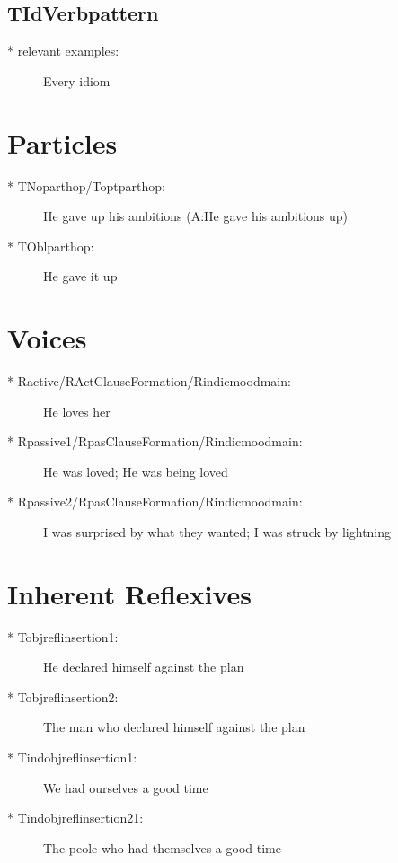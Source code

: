 \subsection{TIdVerbpattern}
\begin{description}
\item[* relevant examples:] Every idiom\\
\end{description}


\section {Particles}
\begin{description}
\item [* TNoparthop/Toptparthop:] He gave up his ambitions 
(A:He gave his ambitions up)\\
\item [* TOblparthop:] He gave it up\\
\end{description}

\section {Voices}
\begin{description}
\item [* Ractive/RActClauseFormation/Rindicmoodmain:] He loves her
\item [* Rpassive1/RpasClauseFormation/Rindicmoodmain:] He was loved; He was 
being loved
\item [* Rpassive2/RpasClauseFormation/Rindicmoodmain:] I was surprised by what 
they wanted; I was struck by lightning
\end{description}
\section {Inherent Reflexives}
\begin{description}
\item [* Tobjreflinsertion1:] He declared himself against the plan
\item [* Tobjreflinsertion2:] The man who declared himself against the plan
\item [* Tindobjreflinsertion1:] We had ourselves a good time
\item [* Tindobjreflinsertion21:] The peole who had themselves a good time
\end{description}
